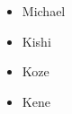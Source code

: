 \documentclass{article}
\begin{document}
	\begin{itemize}
		\item Michael
		\item Kishi
		\item Koze
		\item Kene
	\end{itemize}
\end{document}
